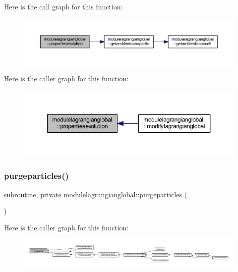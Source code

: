 Here is the call graph for this function\+:\nopagebreak
\begin{figure}[H]
\begin{center}
\leavevmode
\includegraphics[width=350pt]{namespacemodulelagrangianglobal_ad41aee81fdf2c272327a709b9f90d33b_cgraph}
\end{center}
\end{figure}
Here is the caller graph for this function\+:\nopagebreak
\begin{figure}[H]
\begin{center}
\leavevmode
\includegraphics[width=350pt]{namespacemodulelagrangianglobal_ad41aee81fdf2c272327a709b9f90d33b_icgraph}
\end{center}
\end{figure}
\mbox{\label{namespacemodulelagrangianglobal_abe2068918e9b300501fc826856caeafa}} 
\subsubsection{\texorpdfstring{purgeparticles()}{purgeparticles()}}
{\footnotesize\ttfamily subroutine, private modulelagrangianglobal\+::purgeparticles (\begin{DoxyParamCaption}{ }\end{DoxyParamCaption})\hspace{0.3cm}{\ttfamily [private]}}

Here is the caller graph for this function\+:\nopagebreak
\begin{figure}[H]
\begin{center}
\leavevmode
\includegraphics[width=350pt]{namespacemodulelagrangianglobal_abe2068918e9b300501fc826856caeafa_icgraph}
\end{center}
\end{figure}
\mbox{\label{namespacemodulelagrangianglobal_ae6c369ad79b4c62328e4792cd7aed791}} 
